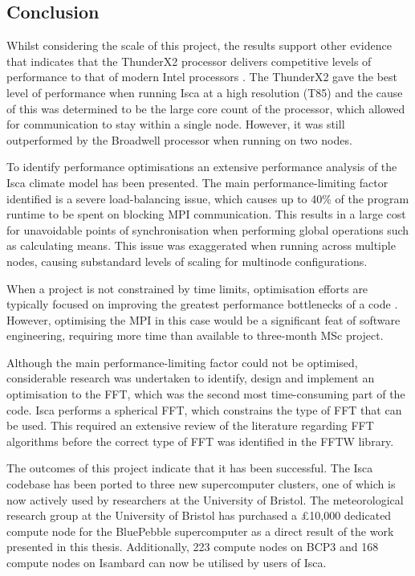\documentclass[a4paper,11pt]{report}
\begin{document}
\subsection{Conclusion}
Whilst considering the scale of this project, the results support other evidence that indicates that the ThunderX2 processor delivers competitive levels of performance to that of modern Intel processors \cite{mcintosh2018performance}. The ThunderX2 gave the best level of performance when running Isca at a high resolution (T85) and the cause of this was determined to be the large core count of the processor, which allowed for communication to stay within a single node. However, it was still outperformed by the Broadwell processor when running on two nodes. 
\par
To identify performance optimisations an extensive performance analysis of the Isca climate model has been presented. The main performance-limiting factor identified is a severe load-balancing issue, which causes up to 40\% of the program runtime to be spent on blocking MPI communication. This results in a large cost for unavoidable points of synchronisation when performing global operations such as calculating means. This issue was exaggerated when running across multiple nodes, causing substandard levels of scaling for multinode configurations. 
\par
When a project is not constrained by time limits, optimisation efforts are typically focused on improving the greatest performance bottlenecks of a code \cite{asanovic2006landscape}. However, optimising the MPI in this case would be a significant feat of software engineering, requiring more time than available to three-month MSc project.
\par
Although the main performance-limiting factor could not be optimised, considerable research was undertaken to identify, design and implement an optimisation to the FFT, which was the second most time-consuming part of the code. Isca performs a spherical FFT, which constrains the type of FFT that can be used. This required an extensive review of the literature regarding FFT algorithms before the correct type of FFT was identified in the FFTW library.
\par
The outcomes of this project indicate that it has been successful. The Isca codebase has been ported to three new supercomputer clusters, one of which is now actively used by researchers at the University of Bristol. The meteorological research group at the University of Bristol has purchased a £10,000 dedicated compute node for the BluePebble supercomputer as a direct result of the work presented in this thesis. Additionally, 223 compute nodes on BCP3 and 168 compute nodes on Isambard can now be utilised by users of Isca. 
\end{document}
